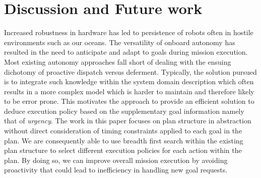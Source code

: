 \section{Discussion and Future work}
\label{sec:conclude}

Increased robustness in hardware has led to persistence of robots
often in hostile environments such as our oceans. The versatility of
onboard autonomy has resulted in the need to anticipate and adapt to
goals during mission execution.  Most existing autonomy approaches
fall short of dealing with the ensuing dichotomy of proactive dispatch
versus deferment.  Typically, the solution pursued is to integrate
such knowledge within the system domain description which often
results in a more complex model which is harder to maintain and
therefore likely to be error prone.  This motivates the approach to
provide an efficient solution to deduce execution policy based on the
supplementary goal information namely that of {\em urgency}.  The work
in this paper focuses on plan structure in abstraction without direct
consideration of timing constraints applied to each goal in the
plan. We are consequently able to use breadth first search within the
existing plan structure to select different execution policies for
each action within the plan. By doing so, we can improve overall
mission execution by avoiding proactivity that could lead to
inefficiency in handling new goal requests.

